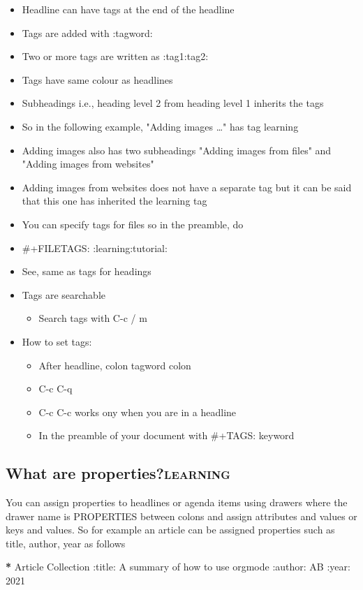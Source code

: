 \documentclass[11pt]{article}
\begin{document}
\begin{itemize}
\item Headline can have tags at the end of the headline
\item Tags are added with :tagword:
\item Two or more tags are written as :tag1:tag2:
\item Tags have same colour as headlines
\item Subheadings i.e., heading level 2 from heading level 1 inherits the tags
\item So in the following example, "Adding images \ldots{}" has tag learning
\item Adding images also has two subheadings "Adding images from files" and
"Adding images from websites"
\item Adding images from websites does not have a separate tag but it can be said that this one has inherited the learning tag
\item You can specify tags for files so in the preamble, do
\item \#+FILETAGS: :learning:tutorial:
\item See, same as tags for headings
\item Tags are searchable
\begin{itemize}
\item Search tags with C-c / m
\end{itemize}
\item How to set tags:
\begin{itemize}
\item After headline, colon tagword colon
\item C-c C-q
\item C-c C-c works ony when you are in a headline
\item In the preamble of your document with \#+TAGS: keyword
\end{itemize}
\end{itemize}

\subsection{What are properties?\hfill{}\textsc{learning}}
\label{sec:org2956194}
You can assign properties to headlines or agenda items using drawers  where the drawer name is PROPERTIES between colons and assign attributes and values or keys and values. So for example an article can be assigned properties such as title, author, year as follows

\textbf{*} Article Collection
:title: A summary of how to use orgmode
:author: AB
:year: 2021
\end{document}
